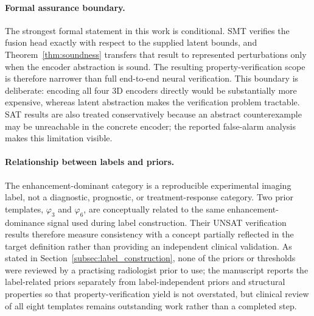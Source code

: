 \documentclass[preprint,11pt]{elsarticle}
\begin{document}
\paragraph{Formal assurance boundary.}
The strongest formal statement in this work is conditional. SMT verifies the fusion head exactly with respect to the supplied latent bounds, and Theorem~\ref{thm:soundness} transfers that result to represented perturbations only when the encoder abstraction is sound. The resulting property-verification scope is therefore narrower than full end-to-end neural verification. This boundary is deliberate: encoding all four 3D encoders directly would be substantially more expensive, whereas latent abstraction makes the verification problem tractable. SAT results are also treated conservatively because an abstract counterexample may be unreachable in the concrete encoder; the reported false-alarm analysis makes this limitation visible.

\paragraph{Relationship between labels and priors.}
The enhancement-dominant category is a reproducible experimental imaging label, not a diagnostic, prognostic, or treatment-response category. Two prior templates, $\varphi_3$ and $\varphi_6$, are conceptually related to the same enhancement-dominance signal used during label construction. Their UNSAT verification results therefore measure consistency with a concept partially reflected in the target definition rather than providing an independent clinical validation. As stated in Section~\ref{subsec:label_construction}, none of the priors or thresholds were reviewed by a practising radiologist prior to use; the manuscript reports the label-related priors separately from label-independent priors and structural properties so that property-verification yield is not overstated, but clinical review of all eight templates remains outstanding work rather than a completed step.
\end{document}
